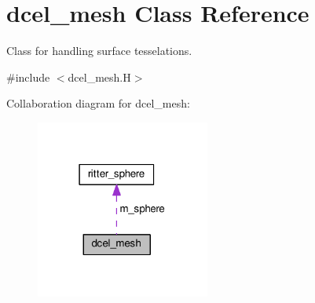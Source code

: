 \hypertarget{classdcel__mesh}{}\section{dcel\+\_\+mesh Class Reference}
\label{classdcel__mesh}


Class for handling surface tesselations.  




{\ttfamily \#include $<$dcel\+\_\+mesh.\+H$>$}



Collaboration diagram for dcel\+\_\+mesh\+:\nopagebreak
\begin{figure}[H]
\begin{center}
\leavevmode
\includegraphics[width=162pt]{classdcel__mesh__coll__graph}
\end{center}
\end{figure}
